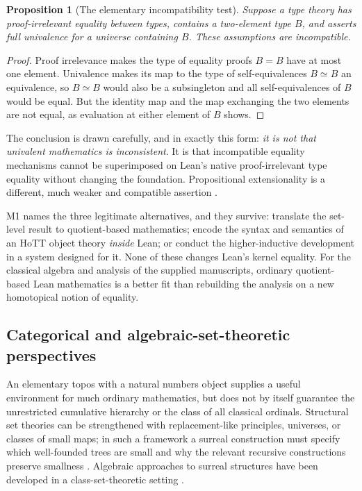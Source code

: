 \documentclass[11pt,letterpaper]{article}
\numberwithin{equation}{section}
\newtheorem{proposition}[theorem]{Proposition}
\theoremstyle{definition}
\theoremstyle{remark}
\begin{document}
\begin{proposition}[The elementary incompatibility test]\label{found:prop:univalence}
Suppose a type theory has proof-irrelevant equality between types, contains a
two-element type $B$, and asserts full univalence for a universe containing $B$.
These assumptions are incompatible.
\end{proposition}
\begin{proof}
Proof irrelevance makes the type of equality proofs $B=B$ have at most one
element. Univalence makes its map to the type of self-equivalences
$B\simeq B$ an equivalence, so $B\simeq B$ would also be a subsingleton and all
self-equivalences of $B$ would be equal. But the identity map and the map
exchanging the two elements are not equal, as evaluation at either element of
$B$ shows.
\end{proof}

The conclusion is drawn carefully, and in exactly this form: \emph{it is not
that univalent mathematics is inconsistent}. It is that incompatible equality
mechanisms cannot be superimposed on Lean's native proof-irrelevant type
equality without changing the foundation. Propositional extensionality is a
different, much weaker and compatible assertion \cite{found:LeanAxioms}.

M1 names the three legitimate alternatives, and they survive: translate the
set-level result to quotient-based mathematics; encode the syntax and semantics
of an HoTT object theory \emph{inside} Lean; or conduct the higher-inductive
development in a system designed for it. None of these changes Lean's kernel
equality. For the classical algebra and analysis of the supplied manuscripts,
ordinary quotient-based Lean mathematics is a better fit than rebuilding the
analysis on a new homotopical notion of equality.

\subsection{Categorical and algebraic-set-theoretic perspectives}
\label{found:sub:categorical}
An elementary topos with a natural numbers object supplies a useful environment
for much ordinary mathematics, but does not by itself guarantee the unrestricted
cumulative hierarchy or the class of all classical ordinals. Structural set
theories can be strengthened with replacement-like principles, universes, or
classes of small maps; in such a framework a surreal construction must specify
which well-founded trees are small and why the relevant recursive constructions
preserve smallness \cite[\S\S13--15]{found:ShulmanSize}. Algebraic approaches to
surreal structures have been developed in a class-set-theoretic setting
\cite{found:RangelMariano}.
\end{document}
